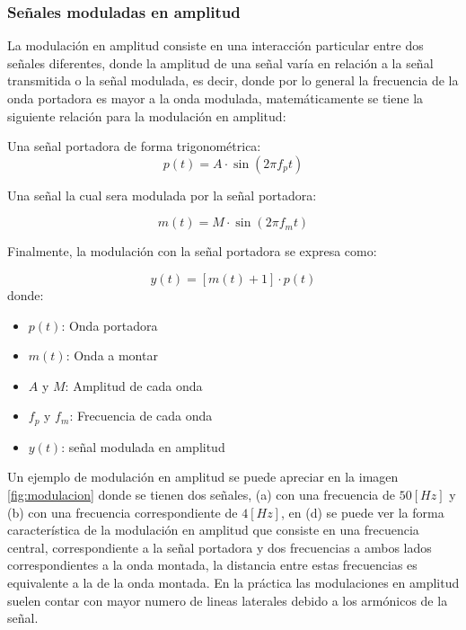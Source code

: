 		\subsubsection{Señales moduladas en amplitud}
			La modulación en amplitud consiste en una interacción particular entre dos señales diferentes, donde la amplitud de una señal varía en relación a la señal transmitida o la señal modulada, es decir, donde por lo general la frecuencia de la onda portadora es mayor a la onda modulada, matemáticamente se tiene la siguiente relación para la modulación en amplitud: 
			
			Una señal portadora de forma trigonométrica:\\
			
			\begin{equation}
				p(t) = A \cdot \sin \left(2 \pi f_{p}t \right)			
			\end{equation}
			
			Una señal la cual sera modulada por la señal portadora: 
			
			\begin{equation}
				m(t)= M \cdot \sin \left(2 \pi f_{m} t \right) 
			\end{equation}
			
			Finalmente, la modulación con la señal portadora se expresa como: 
			
			\begin{equation}
				y(t)=\left[m(t)+1\right ]\cdot p(t)				
			\end{equation}
			donde: 
			
			\begin{itemize}
				\item $p(t)$: Onda portadora
				\item $m(t)$: Onda a montar
				\item $A$ y $M$: Amplitud de cada onda
				\item $f_{p}$ y $f_{m}$: Frecuencia de cada onda
				\item $y(t)$: señal modulada en amplitud
			\end{itemize}
			
			Un ejemplo de modulación en amplitud se puede apreciar en la imagen \ref{fig:modulacion} donde se tienen dos señales, (a) con una frecuencia de $50[Hz]$ y (b) con una frecuencia correspondiente de $4[Hz]$, en (d) se puede ver la forma característica de la modulación en amplitud que consiste en una frecuencia central, correspondiente a la señal portadora y dos frecuencias a ambos lados correspondientes a la onda montada, la distancia entre estas frecuencias es equivalente a la de la onda montada. En la práctica las modulaciones en amplitud suelen contar con mayor numero de lineas laterales debido a los armónicos de la señal.\\
			
